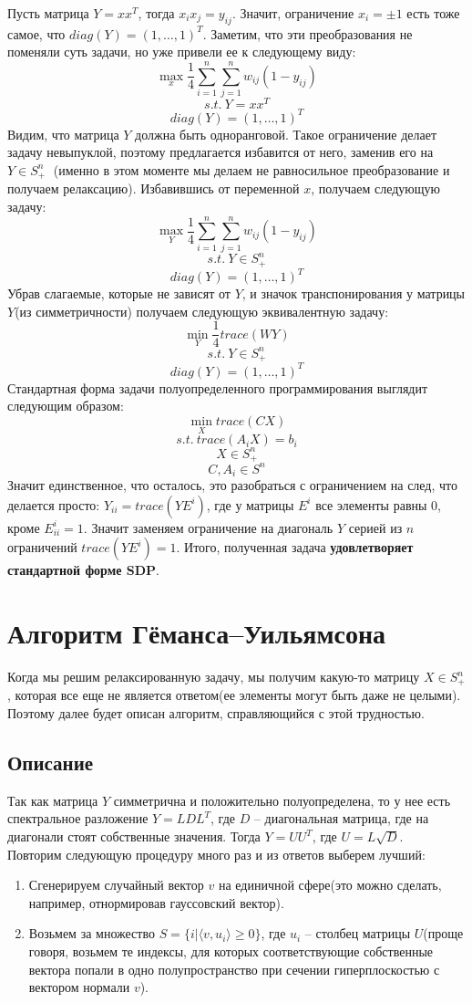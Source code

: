 \documentclass[12pt, a4paper]{article}
\begin{document}
Пусть матрица $Y=xx^T$, тогда $x_i x_j = y_{ij}$. Значит, ограничение $x_i = \pm 1$ есть тоже самое, что $diag(Y) = (1, \dots, 1)^T$. Заметим, что эти преобразования не поменяли суть задачи, но уже привели ее к следующему виду:
$$\max \limits_{x} \frac{1}{4} \sum_{i = 1}^{n} \sum_{j = 1}^{n} w_{ij}(1 - y_{ij})$$
$$s.t.\: Y = xx^T$$
$$diag(Y) = (1, \dots, 1)^T$$
Видим, что матрица $Y$ должна быть одноранговой. Такое ограничение делает задачу невыпуклой, поэтому предлагается избавится от него, заменив его на $Y \in S^n_+ \;$ (именно в этом моменте мы делаем не равносильное преобразование и получаем релаксацию). Избавившись от переменной $x$, получаем следующую задачу:
$$\max \limits_{Y} \frac{1}{4} \sum_{i = 1}^{n} \sum_{j = 1}^{n} w_{ij}(1 - y_{ij})$$
$$s.t.\: Y \in S_+^n$$
$$diag(Y) = (1, \dots, 1)^T$$
Убрав слагаемые, которые не зависят от $Y$, и значок транспонирования у матрицы $Y$(из симметричности) получаем следующую эквивалентную задачу:
$$\min \limits_{Y} \frac{1}{4} trace(WY)$$
$$s.t.\: Y \in S_+^n$$
$$diag(Y) = (1, \dots, 1)^T$$
Стандартная форма задачи полуопределенного программирования выглядит следующим образом:
$$\min \limits_{X} trace(CX)$$
$$s.t.\: trace(A_i X) = b_i$$
$$X \in S_+^n$$
$$C, A_i \in S^n$$
Значит единственное, что осталось, это разобраться с ограничением на след, что делается просто:
$Y_{ii} = trace(Y E^i)$, где у матрицы $E^i$ все элементы равны $0$, кроме $E^i_{ii} = 1$. Значит заменяем ограничение на диагональ $Y$ серией из $n$ ограничений $trace(Y E^i) = 1$. Итого, полученная задача \textbf{удовлетворяет стандартной форме SDP}.

\section{Алгоритм Гёманса–Уильямсона}
Когда мы решим релаксированную задачу, мы получим какую-то матрицу $X \in S^n_+$, которая все еще не является ответом(ее элементы могут быть даже не целыми). Поэтому далее будет описан алгоритм, справляющийся с этой трудностью.
\subsection{Описание}
Так как матрица $Y$ симметрична и положительно полуопределена, то у нее есть спектральное разложение $Y = LDL^T$, где $D$ -- диагональная матрица, где на диагонали стоят собственные значения. Тогда $Y = UU^T$, где $U = L\sqrt{D}$.\\

Повторим следующую процедуру много раз и из ответов выберем лучший:
\begin{enumerate}
    \item
    Сгенерируем случайный вектор $v$ на единичной сфере(это можно сделать, например, отнормировав гауссовский вектор).
    \item
    Возьмем за множество $S = \{i|\langle v, u_i \rangle \geqslant 0 \}$, где $u_i$ -- столбец матрицы $U$(проще говоря, возьмем те индексы, для которых соответствующие собственные вектора попали в одно полупространство при сечении гиперплоскостью с вектором нормали $v$).
\end{enumerate}
\end{document}
